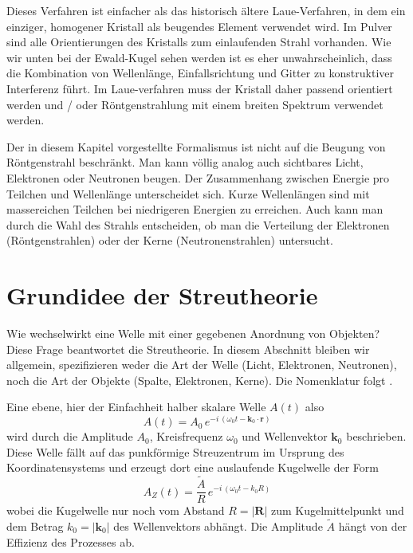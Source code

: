 Dieses Verfahren ist einfacher als das historisch ältere Laue-Verfahren, in dem ein einziger, homogener Kristall als beugendes Element verwendet wird. Im Pulver sind alle Orientierungen  des Kristalls zum einlaufenden Strahl vorhanden. Wie wir unten bei der Ewald-Kugel sehen werden ist es eher unwahrscheinlich, dass die Kombination von Wellenlänge, Einfallsrichtung und Gitter zu konstruktiver Interferenz führt. Im Laue-verfahren muss der Kristall daher passend orientiert werden und / oder Röntgenstrahlung mit einem breiten Spektrum verwendet werden.

Der in diesem Kapitel vorgestellte Formalismus ist nicht auf die Beugung von Röntgenstrahl beschränkt. Man kann völlig analog auch sichtbares Licht, Elektronen oder Neutronen beugen. Der Zusammenhang zwischen Energie pro Teilchen und Wellenlänge unterscheidet sich. Kurze Wellenlängen sind mit massereichen Teilchen bei niedrigeren Energien zu erreichen.  Auch kann man durch die Wahl des Strahls entscheiden, ob man die Verteilung der Elektronen (Röntgenstrahlen) oder der Kerne (Neutronenstrahlen) untersucht. 


\section{Grundidee der Streutheorie}


Wie wechselwirkt eine Welle mit einer gegebenen Anordnung von Objekten? Diese Frage beantwortet die Streutheorie. In diesem Abschnitt bleiben wir allgemein, spezifizieren weder die Art der Welle (Licht, Elektronen, Neutronen), noch die Art der Objekte (Spalte, Elektronen, Kerne). Die Nomenklatur folgt \cite{Hunklinger2014}.

Eine ebene, hier der Einfachheit halber skalare Welle $A(t)$ also
\begin{equation}
 A(t) = A_0 \, e^{- i \, (\omega_0 t - \mathbf{k}_0 \cdot \mathbf{r})}
\end{equation}
wird durch die Amplitude $A_0$, Kreisfrequenz $\omega_0$ und Wellenvektor $\mathbf{k}_0$ beschrieben. Diese Welle fällt auf das punkförmige Streuzentrum im Ursprung des Koordinatensystems und erzeugt dort eine auslaufende Kugelwelle der Form
\begin{equation}
 A_Z(t) = \frac{\tilde{A}}{R} \,  e^{- i \, (\omega_0 t - k_0 R)}
\end{equation}
wobei  die Kugelwelle nur noch vom Abstand $R = |\mathbf{R}|$ zum Kugelmittelpunkt und dem Betrag $k_0 = | \mathbf{k}_0| $ des Wellenvektors abhängt. Die Amplitude $\tilde{A}$ hängt von der Effizienz des Prozesses ab.

